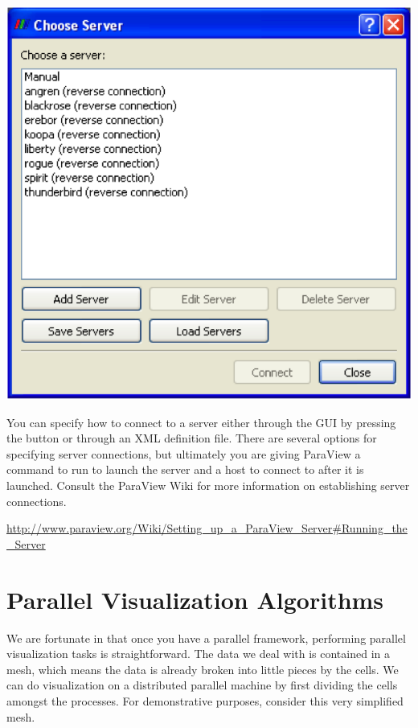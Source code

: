 \begin{inlinefig}
  \includegraphics[width=.66\scw]{images/ChooseServer}
\end{inlinefig}

You can specify how to connect to a server either through the GUI by
pressing the  button or through an XML definition file.
There are several options for specifying server connections, but ultimately
you are giving ParaView a command to run to launch the server and a host to
connect to after it is launched.  Consult the ParaView Wiki for more
information on establishing server connections.

{
  \footnotesize
  \href{http://www.paraview.org/Wiki/Setting_up_a_ParaView_Server#Running_the_Server}{http://www.paraview.org/Wiki/Setting\_up\_a\_ParaView\_Server\#Running\_the\_Server}
}


\section{Parallel Visualization Algorithms}

We are fortunate in that once you have a parallel framework, performing
parallel visualization tasks is straightforward.  The data we deal with is
contained in a mesh, which means the data is already broken into little
pieces by the cells.  We can do visualization on a distributed parallel
machine by first dividing the cells amongst the processes.  For
demonstrative purposes, consider this very simplified mesh.

